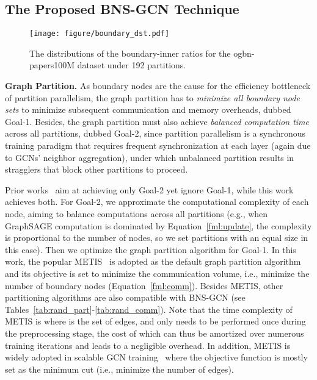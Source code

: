 \documentclass{article}
\newcommand{\niparagraph}[1]{\noindent\textbf{#1}}
\begin{document}
\subsection{The Proposed BNS-GCN Technique}

\begin{figure}[t]
    \centering
    \texttt{[image: figure/boundary\_dst.pdf]}
        \caption{The distributions of the boundary-inner ratios for the ogbn-papers100M dataset under 192 partitions.}
    \label{fig:bd_dist}
\end{figure}

\label{sec:BNS-GCN}
\niparagraph{Graph Partition.}
As boundary nodes are the cause for the efficiency bottleneck of partition parallelism, the graph partition has to \textit{minimize all boundary node sets} to minimize subsequent communication and memory overheads, dubbed Goal-1. 
Besides, the graph partition must also achieve \textit{balanced computation time} across all partitions, dubbed Goal-2, since partition parallelism is a synchronous training paradigm that requires frequent synchronization at each layer (again due to GCNs' neighbor aggregation), under which unbalanced partition results in stragglers that block other partitions to proceed.


Prior works~\citep{tripathy2020reducing,zheng2020distdgl} aim at achieving only Goal-2 yet ignore Goal-1, while this work achieves both.
For Goal-2, we approximate the computational complexity of each node, aiming to balance computations across all partitions (e.g., when GraphSAGE computation is dominated by Equation~\ref{fml:update}, the complexity is proportional to the number of nodes, so we set partitions with an equal size in this case).
Then we optimize the graph partition algorithm for Goal-1.
In this work, the popular METIS~\citep{karypis1998fast} is adopted as the default graph partition algorithm and its objective is set to minimize the communication volume, i.e., minimize the number of boundary nodes (Equation~\ref{fml:comm}).
Besides METIS, other partitioning algorithms are also compatible with BNS-GCN (see Tables~\ref{tab:rand_part}-\ref{tab:rand_comm}). 
Note that the time complexity of METIS is  where  is the set of edges, and only needs to be performed once during the preprocessing stage, the cost of which can thus be amortized over numerous training iterations and leads to a negligible overhead. 
In addition, METIS is widely adopted in scalable GCN training~\citep{zhu2019aligraph,zheng2020distdgl,fey2021gnnautoscale,wan2022pipegcn} where the objective function is mostly set as the minimum cut (i.e., minimize the number of edges).
\end{document}
